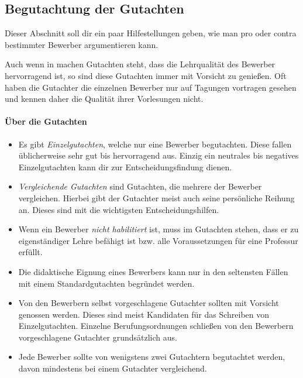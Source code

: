 \subsection{Begutachtung der Gutachten}
Dieser Abschnitt soll dir ein paar Hilfestellungen geben, wie man pro oder contra bestimmter Bewerber argumentieren kann.

Auch wenn in machen Gutachten steht, dass die Lehrqualität des Bewerber hervorragend ist, so sind diese Gutachten immer mit Vorsicht zu genießen. Oft haben die Gutachter die einzelnen Bewerber nur auf Tagungen vortragen gesehen und kennen daher die Qualität ihrer Vorlesungen nicht.

\paragraph{Über die Gutachten}
\begin{itemize}
    \item Es gibt \emph{Einzelgutachten}, welche nur eine Bewerber begutachten. Diese fallen üblicherweise sehr gut bis hervorragend aus. Einzig ein neutrales bis negatives Einzelgutachten kann dir zur Entscheidungsfindung dienen.
    \item \emph{Vergleichende Gutachten} sind Gutachten, die mehrere der Bewerber vergleichen. Hierbei gibt der Gutachter meist auch seine persönliche Reihung an. Dieses sind mit die wichtigsten Entscheidungshilfen.
    \item Wenn ein Bewerber \emph{nicht habilitiert} ist, muss im Gutachten stehen, dass er zu eigenständiger Lehre befähigt ist bzw. alle Voraussetzungen für eine Professur erfüllt.
    \item Die didaktische Eignung eines Bewerbers kann nur in den seltensten Fällen mit einem Standardgutachten begründet werden.
    \item Von den Bewerbern selbst vorgeschlagene Gutachter sollten mit Vorsicht genossen werden. Dieses sind meist Kandidaten für das Schreiben von Einzelgutachten. Einzelne Berufungsordnungen schließen von den Bewerbern vorgeschlagene Gutachter grundsätzlich aus.
    \item Jede Bewerber sollte von wenigstens zwei Gutachtern begutachtet werden, davon mindestens bei einem Gutachter vergleichend.
\end{itemize}

